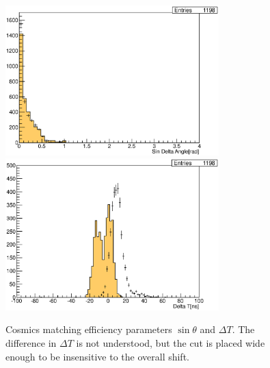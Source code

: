 {\begin{landscape}
\begin{figure}[h]
\centering
\includegraphics[width=3.25in]{Figures/Systematics/MatchingEfficiency/dScosmics.eps}
\includegraphics[width=3.25in]{Figures/Systematics/MatchingEfficiency/dTcosmics.eps}
\caption{Cosmics matching efficiency parameters \(\sin \theta\) and \(\Delta T\). The difference in \(\Delta T\) is not understood, but the cut is placed wide enough to be insensitive to the overall shift.}
\label{fig:eff_dSdT}
\end{figure}
\end{landscape}
}

